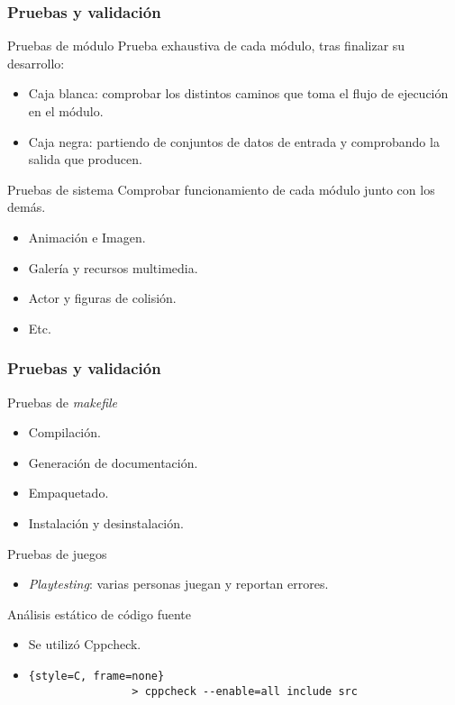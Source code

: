 \begin{frame}
\frametitle{Pruebas y validación}
	\begin{block}{Pruebas de módulo}
		\noindent Prueba exhaustiva de cada módulo, tras finalizar su desarrollo:
		\begin{itemize}
			\item Caja blanca: comprobar los distintos caminos que toma el flujo de ejecución en el módulo.
			\item Caja negra: partiendo de conjuntos de datos de entrada y comprobando la salida que producen.
		\end{itemize}
	\end{block}
	\pause
	\begin{block}{Pruebas de sistema}
		\noindent Comprobar funcionamiento de cada módulo junto con los demás.
		\begin{itemize}
			\item Animación e Imagen.
			\item Galería y recursos multimedia.
			\item Actor y figuras de colisión.
			\item Etc.
		\end{itemize}
	\end{block}
\end{frame}

\begin{frame}[fragile]
\frametitle{Pruebas y validación}
	\begin{block}{Pruebas de \textit{makefile}}
		\begin{itemize}
			\item Compilación.
			\item Generación de documentación.
			\item Empaquetado.
			\item Instalación y desinstalación.
		\end{itemize}
	\end{block}
	\begin{block}{Pruebas de juegos}
		\begin{itemize}
			\item \textit{Playtesting}: varias personas juegan y reportan errores.
		\end{itemize}
	\end{block}
	\begin{block}{Análisis estático de código fuente}
		\begin{itemize}
			\item Se utilizó Cppcheck.
			\item \begin{lstlisting}{style=C, frame=none}
				> cppcheck --enable=all include src
			\end{lstlisting}
		\end{itemize}
	\end{block}
\end{frame}

